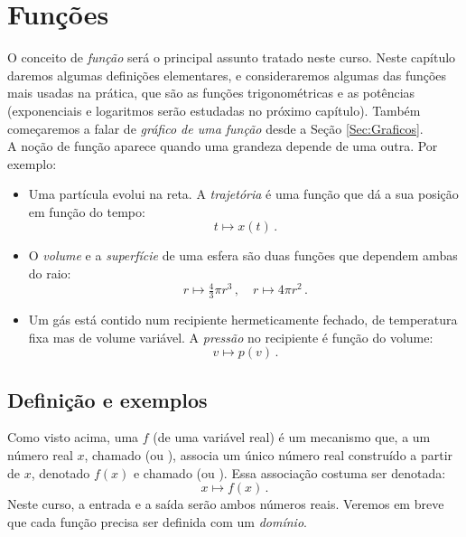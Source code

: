 

\chapter{Funções}\label{Cap:Funcoes}

\ifdefined\updateans
\fi

O conceito de \emph{função} será o principal assunto 
tratado neste curso.
Neste capítulo daremos algumas definições elementares, e consideraremos
algumas das funções mais usadas na prática, que são as funções 
trigonométricas e as
potências (exponenciais e logaritmos serão estudadas no próximo capítulo).
Também começaremos a falar de \emph{gráfico de uma função} desde a Seção
\ref{Sec:Graficos}.\\

A noção de função aparece quando uma grandeza depende de 
uma outra. Por exemplo:

\begin{itemize}
\item Uma partícula evolui na reta. A \emph{trajetória} é uma função que 
dá a sua posição em função do tempo:
$$t\mapsto x(t)\,.$$

\item 
O \emph{volume} e a \emph{superfície} de uma esfera são duas funções que 
dependem ambas do raio:
$$r\mapsto \tfrac{4}{3}\pi r^3\,,\quad r\mapsto 4\pi r^2\,.$$

\item 
Um gás está contido num recipiente hermeticamente fechado, de 
temperatura fixa mas de volume variável. A \emph{pressão} no recipiente 
é função do volume:
$$v\mapsto p(v)\,.$$
\end{itemize}

\section{Definição e exemplos}

Como visto acima, uma  $f$ (de uma variável real) é um 
mecanismo que, a um número real 
$x$, chamado  (ou ), associa um
único número real construído a partir de 
$x$, denotado $f(x)$ e chamado  (ou ). Essa associação costuma
ser denotada: 
$$x\mapsto f(x)\,.$$
Neste curso, a entrada e a saída serão ambos números reais.
Veremos em breve que cada função precisa ser definida com um \emph{domínio}.

